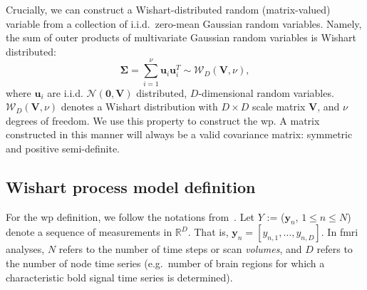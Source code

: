 Crucially, we can construct a Wishart-distributed random (matrix-valued) variable from a collection of i.i.d.~zero-mean Gaussian random variables.
Namely, the sum of outer products of multivariate Gaussian random variables is Wishart distributed:
\begin{equation}
  \mathbf{\Sigma} = \sum_{i=1}^\nu \textbf{u}_i \textbf{u}_i^T \sim \mathcal{W}_D(\mathbf{V}, \nu),
  \label{eq:wishart-from-iid-gaussians}
\end{equation}
where $\textbf{u}_i$ are i.i.d. $\mathcal{N}(\textbf{0}, \mathbf{V})$ distributed, $D$-dimensional random variables.
$\mathcal{W}_D(\mathbf{V}, \nu)$ denotes a Wishart distribution with $D \times D$ scale matrix $\mathbf{V}$, and $\nu$ degrees of freedom.
We use this property to construct the \gls{wp}.
A matrix constructed in this manner will always be a valid covariance matrix: symmetric and positive semi-definite.

\subsection{Wishart process model definition}

For the \gls{wp} definition, we follow the notations from~\textcite{Heaukulani2019}.
Let $Y$ := ($\mathbf{y}_n$, $1 \leq n \leq N$) denote a sequence of measurements in $\mathbb{R}^D$.
That is, $\mathbf{y}_n = [y_{n,1}, \dots, y_{n,D}]$.
In \gls{fmri} analyses, $N$ refers to the number of time steps or scan \emph{volumes}, and $D$ refers to the number of node time series (e.g.~number of brain regions for which a characteristic \gls{bold} signal time series is determined).

